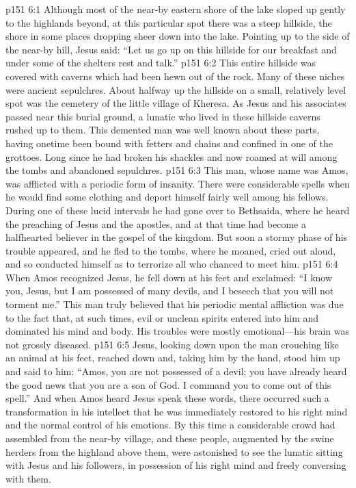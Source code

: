\vs p151 6:1 Although most of the near\hyp{}by eastern shore of the lake sloped up gently to the highlands beyond, at this particular spot there was a steep hillside, the shore in some places dropping sheer down into the lake. Pointing up to the side of the near\hyp{}by hill, Jesus said: \textcolor{ubdarkred}{“Let us go up on this hillside for our breakfast and under some of the shelters rest and talk.”}
\vs p151 6:2 This entire hillside was covered with caverns which had been hewn out of the rock. Many of these niches were ancient sepulchres. About halfway up the hillside on a small, relatively level spot was the cemetery of the little village of Kheresa. As Jesus and his associates passed near this burial ground, a lunatic who lived in these hillside caverns rushed up to them. This demented man was well known about these parts, having onetime been bound with fetters and chains and confined in one of the grottoes. Long since he had broken his shackles and now roamed at will among the tombs and abandoned sepulchres.
\vs p151 6:3 This man, whose name was Amos, was afflicted with a periodic form of insanity. There were considerable spells when he would find some clothing and deport himself fairly well among his fellows. During one of these lucid intervals he had gone over to Bethsaida, where he heard the preaching of Jesus and the apostles, and at that time had become a halfhearted believer in the gospel of the kingdom. But soon a stormy phase of his trouble appeared, and he fled to the tombs, where he moaned, cried out aloud, and so conducted himself as to terrorize all who chanced to meet him.
\vs p151 6:4 When Amos recognized Jesus, he fell down at his feet and exclaimed: “I know you, Jesus, but I am possessed of many devils, and I beseech that you will not torment me.” This man truly believed that his periodic mental affliction was due to the fact that, at such times, evil or unclean spirits entered into him and dominated his mind and body. His troubles were mostly emotional---his brain was not grossly diseased.
\vs p151 6:5 Jesus, looking down upon the man crouching like an animal at his feet, reached down and, taking him by the hand, stood him up and said to him: \textcolor{ubdarkred}{“Amos, you are not possessed of a devil; you have already heard the good news that you are a son of God. I command you to come out of this spell.”} And when Amos heard Jesus speak these words, there occurred such a transformation in his intellect that he was immediately restored to his right mind and the normal control of his emotions. By this time a considerable crowd had assembled from the near\hyp{}by village, and these people, augmented by the swine herders from the highland above them, were astonished to see the lunatic sitting with Jesus and his followers, in possession of his right mind and freely conversing with them.
